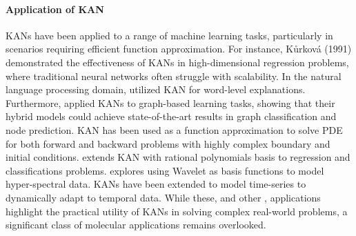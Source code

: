 \paragraph{Application of KAN}
KANs have been applied to a range of machine learning tasks, particularly in scenarios requiring efficient function approximation. For instance, Kůrková (1991) \cite{kurkova1991kolmogorov} demonstrated the effectiveness of KANs in high-dimensional regression problems, where traditional neural networks often struggle with scalability. In the natural language processing domain, \cite{Galitsky2024} utilized KAN for word-level explanations.  
Furthermore, 
\cite{decarlo2024kolmogorovarnoldgraphneuralnetworks}
applied KANs to graph-based learning tasks, showing that their hybrid models could achieve state-of-the-art results in graph classification and node prediction. 
KAN has been used as a function approximation to solve PDE \cite{wang2024kolmogorovarnoldinformedneural,shukla2024comprehensivefaircomparisonmlp} for both forward and backward problems with highly complex boundary and initial conditions.
\cite{aghaei2024rkanrationalkolmogorovarnoldnetworks} extends KAN with rational polynomials basis to regression and classifications problems. \cite{Seydi2024} explores using Wavelet as basis functions to model hyper-spectral data. KANs have been extended to model time-series \cite{xu2024kolmogorovarnoldnetworkstimeseries,inzirillo2024sigkansignatureweightedkolmogorovarnoldnetworks} to dynamically adapt to temporal data. 
While these, and other \cite{somvanshiSurveyKolmogorovArnoldNetwork2024},  applications highlight the practical utility of KANs in solving complex real-world problems, a significant class of molecular applications remains overlooked. 

